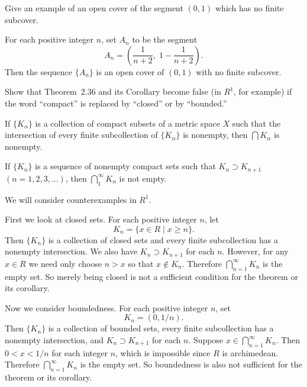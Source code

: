  Give an example of an open cover of the segment $(0,1)$
which has no finite subcover.
\begin{solution}
  For each positive integer $n$, set $A_n$ to be the segment
  \begin{equation*}
    A_n = \left(\frac1{n+2}, \; 1 - \frac1{n+2}\right).
  \end{equation*}
  Then the sequence $\{A_n\}$ is an open cover of $(0,1)$ with no
  finite subcover.
\end{solution}

 Show that Theorem~2.36 and its Corollary become false
(in $R^1$, for example) if the word ``compact'' is replaced by
``closed'' or by ``bounded.''
\begin{thm}
  If $\{K_\alpha\}$ is a collection of compact subsets of a metric
  space $X$ such that the intersection of every finite subcollection
  of $\{K_\alpha\}$ is nonempty, then $\bigcap K_\alpha$ is nonempty.
\end{thm}
\begin{cor}
  If $\{K_n\}$ is a sequence of nonempty compact sets such that
  $K_n\supset K_{n+1}$ $(n = 1,2,3,\dots)$, then
  $\bigcap_1^\infty K_n$ is not empty.
\end{cor}
\begin{solution}
  We will consider counterexamples in $R^1$.

  First we look at closed sets. For each positive integer $n$, let
  \begin{equation*}
    K_n = \{x\in R\mid x\geq n\}.
  \end{equation*}
  Then $\{K_n\}$ is a collection of closed sets and every finite
  subcollection has a nonempty intersection. We also have
  $K_n\supset K_{n+1}$ for each $n$. However, for any $x\in R$ we need
  only choose $n > x$ so that $x\not\in K_n$. Therefore
  $\bigcap_{n=1}^\infty K_n$ is the empty set. So merely being closed
  is not a sufficient condition for the theorem or its corollary.

  Now we consider boundedness. For each positive integer $n$, set
  \begin{equation*}
    K_n = (0, 1/n).
  \end{equation*}
  Then $\{K_n\}$ is a collection of bounded sets, every finite
  subcollection has a nonempty intersection, and $K_n\supset K_{n+1}$
  for each $n$. Suppose $x\in\bigcap_{n=1}^\infty K_n$. Then
  $0 < x < 1/n$ for each integer $n$, which is impossible since $R$ is
  archimedean. Therefore $\bigcap_{n=1}^\infty K_n$ is the empty
  set. So boundedness is also not sufficient for the theorem or its
  corollary.
\end{solution}

